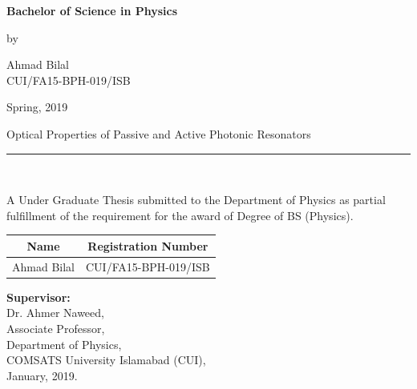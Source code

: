 \documentclass[12pt,twoside]{report}
\begin{document}
	\vspace{0.5 in}
	
	\begin{center}
		{\Large {\textbf{Bachelor of Science in Physics}} }
	\end{center}
	
	\vspace{0.5 in}
	\begin{center}
		{by }
	\end{center}
	\begin{center}
		{\large {Ahmad Bilal\\[0pt]
				CUI/FA15-BPH-019/ISB\\[0pt]
		}}
	\end{center}
	\vspace{0.5 in}
	\begin{center}
		Spring, 2019
	\end{center}
	\newpage
	\begin{center}
{\Large {Optical Properties of Passive and Active Photonic Resonators}\\[0pt]
		\noindent\rule{18cm}{3pt}} \\
\end{center}
\vspace{0.2 in} 
		A Under Graduate Thesis submitted to the Department of Physics as partial fulfillment of the requirement for the award of Degree of BS (Physics). 
\vspace{0.5 in}
\begin{center}
	\begin{tabular}{ | c| c | }
			\hline
			Name &  Registration Number \\
			\hline
		Ahmad Bilal & CUI/FA15-BPH-019/ISB \\ 
			\hline
	\end{tabular}
\end{center}
	\vspace{3 in}
	\textbf {Supervisor:}\\
	Dr. Ahmer Naweed,\\
	Associate Professor,\\
	Department of Physics,\\
	COMSATS University Islamabad (CUI),\\
	January, 2019.
	\newpage
	
\end{document}
